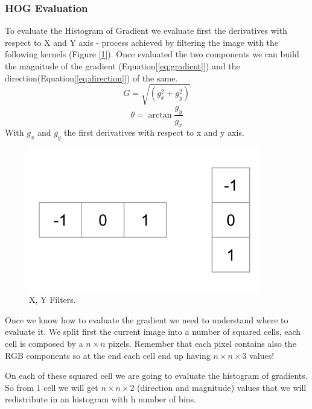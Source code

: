 \documentclass{article}
\begin{document}
\subsubsection{ HOG Evaluation}
\begin{minipage}{0.5\textwidth}
To evaluate the Histogram of Gradient we evaluate first the derivatives with respect to X and Y axis - process achieved by filtering the image with the following kernels (Figure [\ref{xy_filters}]). Once evaluated the two components we can build the magnitude of the gradient (Equation[\ref{eq:gradient}]) and the direction(Equation[\ref{eq:direction}]) of the same.
\begin{equation}\label{eq:gradient}
G = \sqrt{(g_x^2 + g_y^2)}
\end{equation}
\begin{equation}\label{eq:direction}
\theta = \arctan \frac{g_y}{g_x}
\end{equation}
With $g_x$ and $g_y$ the first derivatives with respect to x and y axis.
\end{minipage}
\begin{minipage}{0.5\textwidth}
\begin{figure}[H]
    \centering
    \includegraphics[width=0.9\textwidth]{Images/gradient-kernels.jpg}
    \caption{X, Y Filters.}
    \label{xy_filters}
\end{figure}
\end{minipage}

Once we know how to evaluate the gradient we need to understand where to evaluate it. 
We split first the current image into a number of squared cells, each cell is composed by a $n\times n$ pixels. Remember that each pixel contains also the RGB components so at the end each cell end up having $n\times n \times 3$ values!

On each of these squared cell we are going to evaluate the histogram of gradients. So from 1 cell we will get $n\times n \times 2$ (direction and magnitude) values that we will redistribute in an histogram with h number of bins.
\end{document}
